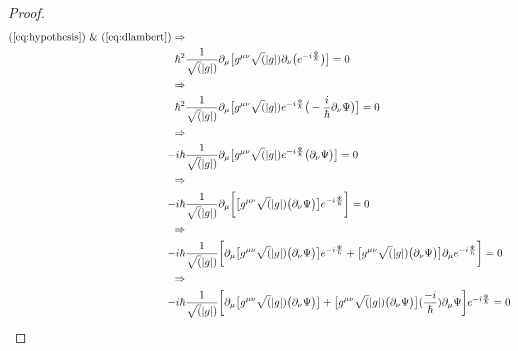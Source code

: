 \documentclass[]{article}
\begin{document}
\begin{proof}
\begin{align*}
	\text{(\ref{eq:hypothesis}) \& (\ref{eq:dlambert})} \Rightarrow&\\
	\hbar^2& \frac{1}{\sqrt(|g|)} \partial_{\mu}\big[ g^{\mu\nu}\sqrt(|g|)\partial_{\nu}\big(e^{-i\frac{\Psi}{\hbar}}\big)\big]=0\\
	\Rightarrow&\\
	\hbar^2& \frac{1}{\sqrt(|g|)} \partial_{\mu}\big[ g^{\mu\nu}\sqrt(|g|)e^{-i\frac{\Psi}{\hbar}}\big(-\frac{i}{\hbar}\partial_{\nu}\Psi\big)\big]=0\\
	\Rightarrow&\\
	-i \hbar& \frac{1}{\sqrt(|g|)} \partial_{\mu}\big[ g^{\mu\nu}\sqrt(|g|)e^{-i\frac{\Psi}{\hbar}}\big(\partial_{\nu}\Psi\big)\big]=0\\
	\Rightarrow&\\
	-i \hbar& \frac{1}{\sqrt(|g|)} \partial_{\mu}\bigg[\big[g^{\mu\nu}\sqrt(|g|)\big(\partial_{\nu}\Psi\big)\big] e^{-i\frac{\Psi}{\hbar}}\bigg]=0 \\
	\Rightarrow&\\
	-i \hbar& \frac{1}{\sqrt(|g|)} \bigg[\partial_{\mu}\big[g^{\mu\nu}\sqrt(|g|)\big(\partial_{\nu}\Psi\big)\big] e^{-i\frac{\Psi}{\hbar}} + \big[g^{\mu\nu}\sqrt(|g|)\big(\partial_{\nu}\Psi\big)\big] \partial_{\mu}e^{-i\frac{\Psi}{\hbar}}\bigg]=0 \\
	\Rightarrow&\\
	-i \hbar& \frac{1}{\sqrt(|g|)} \bigg[\partial_{\mu}\big[g^{\mu\nu}\sqrt(|g|)\big(\partial_{\nu}\Psi\big)\big]  + \big[g^{\mu\nu}\sqrt(|g|)\big(\partial_{\nu}\Psi\big)\big](\frac{-i}{\hbar}) \partial_{\mu}\Psi\bigg]e^{-i\frac{\Psi}{\hbar}}=0
\end{align*}	


\end{proof}
\end{document}
